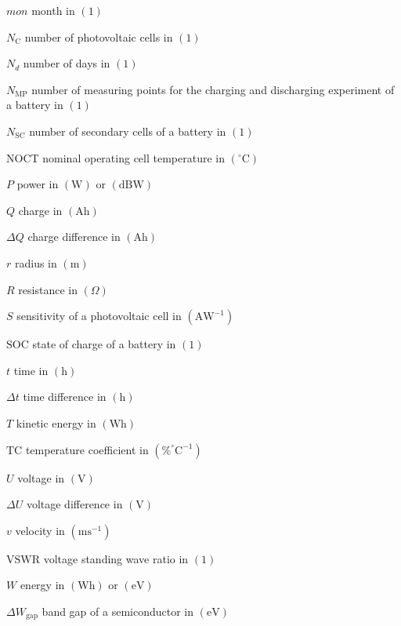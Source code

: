 \begin{symb}
\item[$mon$]							month in $\left(1\right)$
\item[$N_\mathrm{C}$]					number of photovoltaic cells in $\left(1\right)$
\item[$N_d$]							number of days in $\left(1\right)$
\item[$N_\mathrm{MP}$]					number of measuring points for the charging and discharging experiment of a battery in $\left(1\right)$
\item[$N_\mathrm{SC}$]					number of secondary cells of a battery in $\left(1\right)$
\item[$\mathrm{NOCT}$]					nominal operating cell temperature in $\left(^\circ\mathrm{C}\right)$
\item[$P$]								power in $\left(\mathrm{W}\right)$ or $\left(\mathrm{dBW}\right)$				
\item[$Q$]								charge in $\left(\mathrm{Ah}\right)$
\item[$\Delta Q$]						charge difference in $\left(\mathrm{Ah}\right)$
\item[$r$]								radius in $\left(\mathrm{m}\right)$
\item[$R$]								resistance in $\left(\Omega\right)$
\item[$S$]								sensitivity of a photovoltaic cell in $\left(\mathrm{AW}^{-1}\right)$
\item[$\mathrm{SOC}$]					state of charge of a battery in $\left(\mathrm{1}\right)$
\item[$t$]								time in $\left(\mathrm{h}\right)$
\item[$\Delta t$]						time difference in $\left(\mathrm{h}\right)$
\item[$T$]								kinetic energy in $\left(\mathrm{Wh}\right)$
\item[$\mathrm{TC}$]					temperature coefficient in $\left(\%^\circ \mathrm{C}^{-1}\right)$
\item[$U$]								voltage in $\left(\mathrm{V}\right)$
\item[$\Delta U$]						voltage difference in $\left(\mathrm{V}\right)$
\item[$v$]								velocity in $\left(\mathrm{ms}^{-1}\right)$
\item[$\mathrm{VSWR}$]					voltage standing wave ratio in $\left(1\right)$
\item[$W$]								energy in $\left(\mathrm{Wh}\right)$ or $\left(\mathrm{eV}\right)$
\item[$\Delta W_\mathrm{gap}$]			band gap of a semiconductor in $\left(\mathrm{eV}\right)$

\end{symb}
